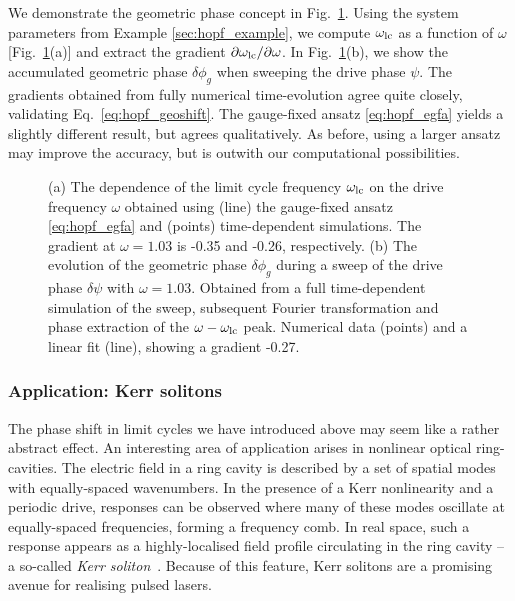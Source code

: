 We demonstrate the geometric phase concept in Fig.~\ref{fig:hopf_lc_phase}. Using the system parameters from Example \ref{sec:hopf_example}, we compute $ \omega_{\rm lc}$ as a function of $\omega$ [Fig.~\ref{fig:hopf_lc_phase}(a)] and extract the gradient $\partial \omega_{\rm lc} / \partial \omega$. In Fig.~\ref{fig:hopf_lc_phase}(b), we show the accumulated geometric phase $\delta \phi_g$ when sweeping the drive phase $\psi$. The gradients obtained from fully numerical time-evolution agree quite closely, validating Eq.~\eqref{eq:hopf_geoshift}. The gauge-fixed ansatz \eqref{eq:hopf_egfa} yields a slightly different result, but agrees qualitatively. As before, using a larger ansatz may improve the accuracy, but is outwith our computational possibilities. 

\begin{figure} [h!]
	\centering
	
	\caption{(a) The dependence of the limit cycle frequency $\omega_{\rm lc}$ on the drive frequency $\omega$ obtained using (line) the gauge-fixed ansatz \eqref{eq:hopf_egfa} and (points) time-dependent simulations. The gradient at $\omega=1.03$ is -0.35 and -0.26, respectively. (b) The evolution of the geometric phase $\delta \phi_g$ during a sweep of the drive phase $\delta \psi$ with $\omega=1.03$. Obtained from a full time-dependent simulation of the sweep, subsequent Fourier transformation and phase extraction of the $\omega - \omega_{\rm lc}$ peak. Numerical data (points) and a linear fit (line), showing a gradient -0.27.}
	\label{fig:hopf_lc_phase}
\end{figure}

\subsubsection{Application: Kerr solitons}

The phase shift in limit cycles we have introduced above may seem like a rather abstract effect. An interesting area of application arises in nonlinear optical ring-cavities. The electric field in a ring cavity is described by a set of spatial modes with equally-spaced wavenumbers. In the presence of a Kerr nonlinearity and a periodic drive, responses can be observed where many of these modes oscillate at equally-spaced frequencies, forming a frequency comb. In real space, such a response appears as a highly-localised field profile circulating in the ring cavity -- a so-called \textit{Kerr soliton}~\cite{Weng_2022, Lugiato_2018, Herr_2012}. Because of this feature, Kerr solitons are a promising avenue for realising pulsed lasers. 

